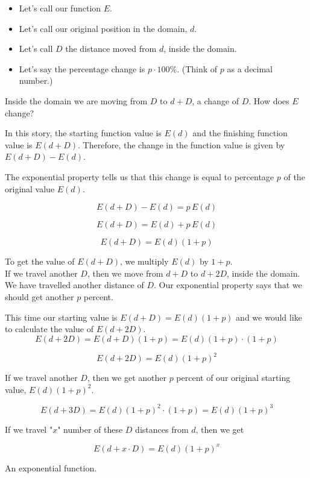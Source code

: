 \documentclass{ximera}
\begin{document}
\begin{observation}

\begin{itemize}
\item Let's call our function $E$.
\item Let's call our original position in the domain, $d$.
\item Let's call $D$ the distance moved from $d$, inside the domain.
\item Let's say the percentage change is $p \cdot 100\%$. (Think of $p$ as a decimal number.)
\end{itemize}



Inside the domain we are moving from $D$ to $d + D$, a change of $D$.  How does $E$ change?



In this story, the starting function value is $E(d)$ and the finishing function value is $E(d+D)$.  Therefore, the change in the function value is given by $E(d+D) - E(d)$.

The exponential property tells us that this change is equal to percentage $p$ of the original value $E(d)$.



\[
E(d+D) - E(d) = p \, E(d)
\]

\[
E(d+D) = E(d) + p \, E(d)
\]


\[
E(d+D) = E(d) (1+p)
\]



To get the value of $E(d+D)$, we multiply $E(d)$ by $1+p$. \\









If we travel another $D$, then we move from $d+D$ to $d+2D$, inside the domain. \\

We have travelled another distance of $D$. Our exponential property says that we should get another $p$ percent.



This time our starting value is $E(d+D) = E(d) (1+p)$ and we would like to calculate the value of $E(d+2D)$. \\




\[
E(d + 2D) = E(d+D)(1+p)  = E(d) (1+p) \cdot (1+p)
\]



\[
E(d + 2D) =  E(d) (1+p)^2
\]


If we travel another $D$, then we get another $p$ percent of our original starting value, $E(d)(1+p)^2$.


\[
E(d + 3D) = E(d)(1+p)^2 \cdot (1+p) = E(d) (1+p)^3
\]



If we travel "$x$" number of these $D$ distances from $d$, then we get

\[
E(d + x \cdot D) = E(d)(1+p)^x 
\]

An exponential function.

\end{observation}
\end{document}
